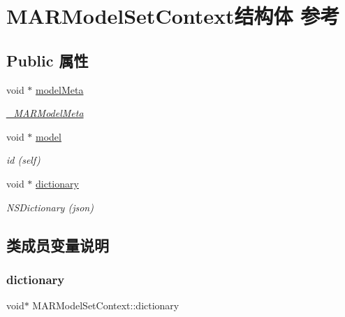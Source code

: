 \hypertarget{struct_m_a_r_model_set_context}{}\section{M\+A\+R\+Model\+Set\+Context结构体 参考}
\label{struct_m_a_r_model_set_context}
\subsection*{Public 属性}
\begin{DoxyCompactItemize}
\item 
void $\ast$ \hyperlink{struct_m_a_r_model_set_context_ad6f5277db320b44302b1432474a20cc4}{model\+Meta}
\begin{DoxyCompactList}\small\item\em \hyperlink{interface___m_a_r_model_meta}{\+\_\+\+M\+A\+R\+Model\+Meta} \end{DoxyCompactList}\item 
void $\ast$ \hyperlink{struct_m_a_r_model_set_context_ad8bc265a61c53ca700445533c770861c}{model}
\begin{DoxyCompactList}\small\item\em id (self) \end{DoxyCompactList}\item 
void $\ast$ \hyperlink{struct_m_a_r_model_set_context_a1691da7664c1298d3379c5e8df907094}{dictionary}
\begin{DoxyCompactList}\small\item\em N\+S\+Dictionary (json) \end{DoxyCompactList}\end{DoxyCompactItemize}


\subsection{类成员变量说明}
\mbox{\label{struct_m_a_r_model_set_context_a1691da7664c1298d3379c5e8df907094}} 
\subsubsection{\texorpdfstring{dictionary}{dictionary}}
{\footnotesize\ttfamily void$\ast$ M\+A\+R\+Model\+Set\+Context\+::dictionary}



